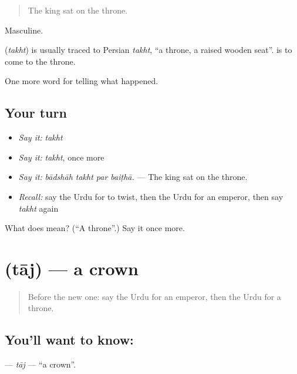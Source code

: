 \begin{quote}
The king sat on the throne.
\end{quote}

Masculine.

\begin{cousinweb}
\textbf{} (\emph{takht}) is usually traced to Persian \emph{takht}, \textquotedblleft{}a throne, a raised wooden seat\textquotedblright{}. \textbf{  } is to come to the throne.
\end{cousinweb}

\begin{grammarlens}[title={What you've built}]
One more word for telling what happened.
\end{grammarlens}

\subsection*{Your turn}
\begin{itemize}
\raggedright
  \item \emph{Say it:} \emph{takht}
  \item \emph{Say it:} \emph{takht}, once more
  \item \emph{Say it:} \emph{bādshāh takht par baiṭhā.} — The king sat on the throne.
  \item \emph{Recall:} say the Urdu for to twist, then the Urdu for an emperor, then say \emph{takht} again
\end{itemize}

\begin{tcolorbox}[breakable,colback=teal!4,colframe=teal!35!black,title={Before you move on}]
What does  mean? (\textquotedblleft{}A throne\textquotedblright{}.) Say it once more.
\end{tcolorbox}
\section[\texorpdfstring{\ur{تاج} (tāj)}{تاج (tāj)}]{ (tāj) — a crown}

\label{lesson:UR-C308-taj}



\begin{quote}
Before the new one: say the Urdu for an emperor, then the Urdu for a throne.
\end{quote}

\subsection*{You'll want to know: }
\textbf{} — \emph{tāj} — \textquotedblleft{}a crown\textquotedblright{}.

